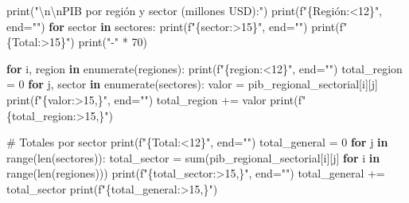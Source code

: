 \documentclass[
  doc,
  floatsintext,
  longtable,
  a4paper,
  nolmodern,
  notxfonts,
  notimes,
  12pt,
  colorlinks=true,linkcolor=blue,citecolor=blue,urlcolor=blue]{apa7}
\newenvironment{Shaded}{\begin{snugshade}}{\end{snugshade}}
\newcommand{\BuiltInTok}[1]{\textcolor[rgb]{0.00,0.23,0.31}{#1}}
\newcommand{\CharTok}[1]{\textcolor[rgb]{0.13,0.47,0.30}{#1}}
\newcommand{\CommentTok}[1]{\textcolor[rgb]{0.37,0.37,0.37}{#1}}
\newcommand{\ControlFlowTok}[1]{\textcolor[rgb]{0.00,0.23,0.31}{\textbf{#1}}}
\newcommand{\DecValTok}[1]{\textcolor[rgb]{0.68,0.00,0.00}{#1}}
\newcommand{\KeywordTok}[1]{\textcolor[rgb]{0.00,0.23,0.31}{\textbf{#1}}}
\newcommand{\NormalTok}[1]{\textcolor[rgb]{0.00,0.23,0.31}{#1}}
\newcommand{\OperatorTok}[1]{\textcolor[rgb]{0.37,0.37,0.37}{#1}}
\newcommand{\SpecialCharTok}[1]{\textcolor[rgb]{0.37,0.37,0.37}{#1}}
\newcommand{\SpecialStringTok}[1]{\textcolor[rgb]{0.13,0.47,0.30}{#1}}
\newcommand{\StringTok}[1]{\textcolor[rgb]{0.13,0.47,0.30}{#1}}
\begin{document}
\begin{Shaded}
\begin{Highlighting}[]
\BuiltInTok{print}\NormalTok{(}\StringTok{"}\CharTok{\textbackslash{}n\textbackslash{}n}\StringTok{PIB por región y sector (millones USD):"}\NormalTok{)}
\BuiltInTok{print}\NormalTok{(}\SpecialStringTok{f"}\SpecialCharTok{\{}\StringTok{\textquotesingle{}Región\textquotesingle{}}\SpecialCharTok{:\textless{}12\}}\SpecialStringTok{"}\NormalTok{, end}\OperatorTok{=}\StringTok{""}\NormalTok{)}
\ControlFlowTok{for}\NormalTok{ sector }\KeywordTok{in}\NormalTok{ sectores:}
    \BuiltInTok{print}\NormalTok{(}\SpecialStringTok{f"}\SpecialCharTok{\{}\NormalTok{sector}\SpecialCharTok{:\textgreater{}15\}}\SpecialStringTok{"}\NormalTok{, end}\OperatorTok{=}\StringTok{""}\NormalTok{)}
\BuiltInTok{print}\NormalTok{(}\SpecialStringTok{f"}\SpecialCharTok{\{}\StringTok{\textquotesingle{}Total\textquotesingle{}}\SpecialCharTok{:\textgreater{}15\}}\SpecialStringTok{"}\NormalTok{)}
\BuiltInTok{print}\NormalTok{(}\StringTok{"{-}"} \OperatorTok{*} \DecValTok{70}\NormalTok{)}

\ControlFlowTok{for}\NormalTok{ i, region }\KeywordTok{in} \BuiltInTok{enumerate}\NormalTok{(regiones):}
    \BuiltInTok{print}\NormalTok{(}\SpecialStringTok{f"}\SpecialCharTok{\{}\NormalTok{region}\SpecialCharTok{:\textless{}12\}}\SpecialStringTok{"}\NormalTok{, end}\OperatorTok{=}\StringTok{""}\NormalTok{)}
\NormalTok{    total\_region }\OperatorTok{=} \DecValTok{0}
    \ControlFlowTok{for}\NormalTok{ j, sector }\KeywordTok{in} \BuiltInTok{enumerate}\NormalTok{(sectores):}
\NormalTok{        valor }\OperatorTok{=}\NormalTok{ pib\_regional\_sectorial[i][j]}
        \BuiltInTok{print}\NormalTok{(}\SpecialStringTok{f"}\SpecialCharTok{\{}\NormalTok{valor}\SpecialCharTok{:\textgreater{}15,\}}\SpecialStringTok{"}\NormalTok{, end}\OperatorTok{=}\StringTok{""}\NormalTok{)}
\NormalTok{        total\_region }\OperatorTok{+=}\NormalTok{ valor}
    \BuiltInTok{print}\NormalTok{(}\SpecialStringTok{f"}\SpecialCharTok{\{}\NormalTok{total\_region}\SpecialCharTok{:\textgreater{}15,\}}\SpecialStringTok{"}\NormalTok{)}

\CommentTok{\# Totales por sector}
\BuiltInTok{print}\NormalTok{(}\SpecialStringTok{f"}\SpecialCharTok{\{}\StringTok{\textquotesingle{}Total\textquotesingle{}}\SpecialCharTok{:\textless{}12\}}\SpecialStringTok{"}\NormalTok{, end}\OperatorTok{=}\StringTok{""}\NormalTok{)}
\NormalTok{total\_general }\OperatorTok{=} \DecValTok{0}
\ControlFlowTok{for}\NormalTok{ j }\KeywordTok{in} \BuiltInTok{range}\NormalTok{(}\BuiltInTok{len}\NormalTok{(sectores)):}
\NormalTok{    total\_sector }\OperatorTok{=} \BuiltInTok{sum}\NormalTok{(pib\_regional\_sectorial[i][j] }\ControlFlowTok{for}\NormalTok{ i }\KeywordTok{in} \BuiltInTok{range}\NormalTok{(}\BuiltInTok{len}\NormalTok{(regiones)))}
    \BuiltInTok{print}\NormalTok{(}\SpecialStringTok{f"}\SpecialCharTok{\{}\NormalTok{total\_sector}\SpecialCharTok{:\textgreater{}15,\}}\SpecialStringTok{"}\NormalTok{, end}\OperatorTok{=}\StringTok{""}\NormalTok{)}
\NormalTok{    total\_general }\OperatorTok{+=}\NormalTok{ total\_sector}
\BuiltInTok{print}\NormalTok{(}\SpecialStringTok{f"}\SpecialCharTok{\{}\NormalTok{total\_general}\SpecialCharTok{:\textgreater{}15,\}}\SpecialStringTok{"}\NormalTok{)}
\end{Highlighting}
\end{Shaded}
\end{document}
